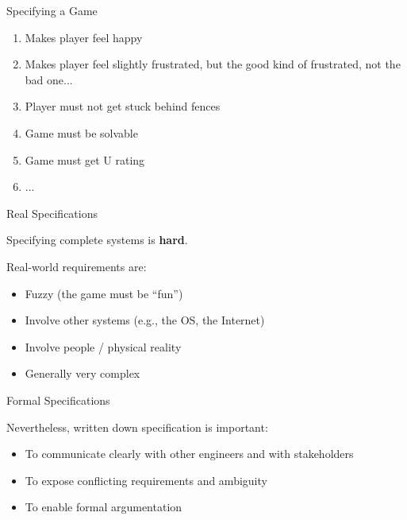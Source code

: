 \documentclass[xetex,aspectratio=169,14pt,hyperref={pdfpagelabels=true,pdflang={en-GB}}]{beamer}
\begin{document}
\begin{frame}
  {Specifying a Game}

  \begin{enumerate}
  \item Makes player feel happy
  \item Makes player feel slightly frustrated, but the good kind of frustrated, not the bad one...
  \item Player must not get stuck behind fences
  \item Game must be solvable
  \item Game must get U rating
  \item ...
  \end{enumerate}
\end{frame}

\begin{frame}
  {Real Specifications}

  Specifying complete systems is {\bf hard}.

  \bigskip

  Real-world requirements are:
  \begin{itemize}
  \item Fuzzy \quad \textcolor{black!60}{(the game must be “fun”)}
  \item Involve other systems \quad \textcolor{black!60}{(e.g., the OS, the Internet)}
  \item Involve people / physical reality
  \item Generally very complex
  \end{itemize}
\end{frame}

\begin{frame}
  {Formal Specifications}

  Nevertheless, written down specification is important:

  \bigskip

  \begin{itemize}
  \item To communicate clearly with other engineers and with stakeholders
  \item To expose conflicting requirements and ambiguity
  \item To enable formal argumentation
  \end{itemize}
\end{frame}

\end{document}
